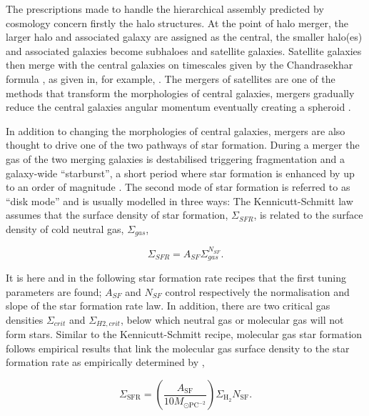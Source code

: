 The prescriptions made to handle the hierarchical assembly predicted by \LCDM cosmology concern firstly the halo structures. At the point of halo merger, the larger halo and associated galaxy are assigned as the central, the smaller halo(es) and associated galaxies become subhaloes and satellite galaxies. Satellite galaxies then merge with the central galaxies on timescales given by the Chandrasekhar formula \citep{Chandrasekhar1943DYNAMICALFRICTION}, as given in, for example, \citet[e.g.][]{Boylan-Kolchin2008}. The mergers of satellites are one of the methods that transform the morphologies of central galaxies, mergers gradually reduce the central galaxies angular momentum eventually creating a spheroid \cite{Hopkins2009HOWMERGERS}. 

In addition to changing the morphologies of central galaxies, mergers are also thought to drive one of the two pathways of star formation. During a merger the gas of the two merging galaxies is destabilised triggering fragmentation and a galaxy-wide ``starburst'', a short period where star formation is enhanced by up to an order of magnitude \citep{Hopkins2009HOWMERGERS, Richard2010StructureMergers}. The second mode of star formation is referred to as ``disk mode'' and is usually modelled in three ways: The Kennicutt-Schmitt law \citep{KennicuttJr.1998TheGalaxies} assumes that the surface density of star formation, $\Sigma_{SFR}$, is related to the surface density of cold neutral gas, $\Sigma_{gas}$,

\begin{equation}
    \Sigma_{SFR} = A_{SF}\Sigma_{gas}^{N_{SF}}.
\end{equation}

It is here and in the following star formation rate recipes that the first tuning parameters are found; $A_{SF}$ and $N_{SF}$ control respectively the normalisation and slope of the star formation rate law. In addition, there are two critical gas densities $\Sigma_{crit}$ and $\Sigma_{H2,crit}$, below which neutral gas or molecular gas will not form stars. Similar to the Kennicutt-Schmitt recipe, molecular gas star formation follows empirical results that link the molecular gas surface density to the star formation rate as empirically determined by \citet{Bigiel2008TheResolution},

\begin{equation}
    \Sigma_{\mathrm{SFR}}=\left(\frac{A_{\mathrm{SF}}}{10 M_{\odot \mathrm{PC}^{-2}}}\right) \Sigma_{\mathrm{H}_{2}} N_{\mathrm{SF}}.
\end{equation}

